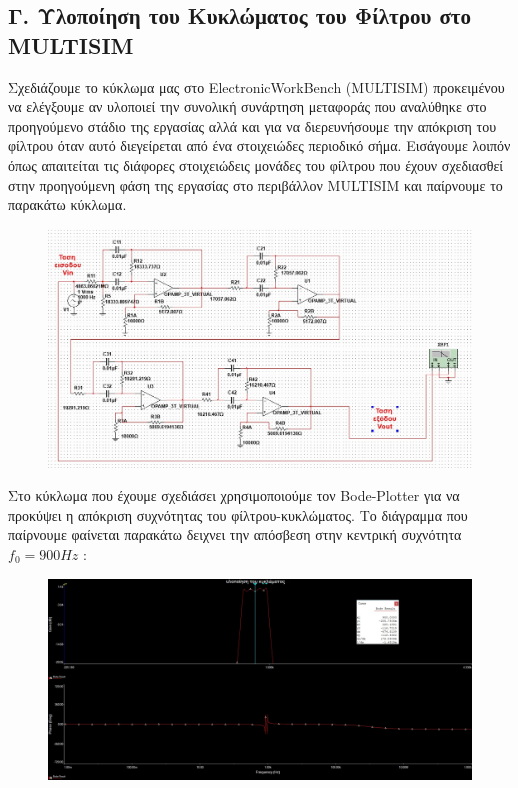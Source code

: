 \documentclass{article}
\begin{document}
{{\subsection*{Γ. Υλοποίηση του Κυκλώματος του Φίλτρου στο MULTISIM}

\large{}
Σχεδιάζουμε το κύκλωμα μας στο ElectronicWorkBench (MULTISIM) προκειμένου να ελέγξουμε αν υλοποιεί την συνολική συνάρτηση μεταφοράς που αναλύθηκε στο προηγούμενο στάδιο της εργασίας αλλά και για να διερευνήσουμε την απόκριση του φίλτρου όταν αυτό διεγείρεται από ένα στοιχειώδες περιοδικό σήμα.
Εισάγουμε λοιπόν όπως απαιτείται τις διάφορες στοιχειώδεις μονάδες του φίλτρου που έχουν σχεδιασθεί στην προηγούμενη φάση της εργασίας στο περιβάλλον MULTISIM και παίρνουμε το παρακάτω κύκλωμα.
\begin{figure}[h!]
\centering
 	\advance\leftskip-3.5cm
  \includegraphics[width=190mm,scale=2]{thema2/multisim0.jpg}
\end{figure} 
\clearpage
Στο κύκλωμα που έχουμε σχεδιάσει χρησιμοποιούμε τον Bode-Plotter για να προκύψει η απόκριση συχνότητας του φίλτρου-κυκλώματος. Το διάγραμμα που παίρνουμε φαίνεται παρακάτω δειχνει την απόσβεση στην κεντρική συχνότητα $f_0 = 900Hz$ :
\begin{figure}[h!]
\centering
 	\advance\leftskip-1cm
  \includegraphics[width=130mm,scale=2]{thema2/multisim1.jpg}

\end{figure}}}
\end{document}
